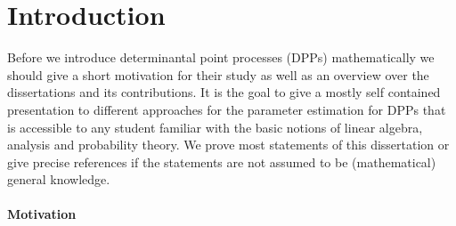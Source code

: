 \chapter*{Introduction}
\manualmark {}









Before we introduce determinantal point processes (DPPs) mathematically we should give a short motivation for their study as well as an overview over the dissertations and its contributions. It is the goal to give a mostly self contained presentation to different approaches for the parameter estimation for DPPs that is accessible to any student familiar with the basic notions of linear algebra, analysis and probability theory. We prove most statements of this dissertation or give precise references if the statements are not assumed to be (mathematical) general knowledge.

\subsubsection*{Motivation}


